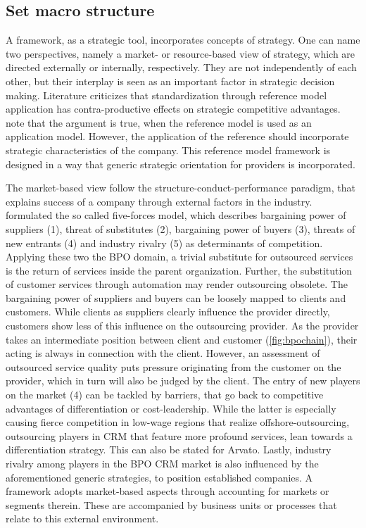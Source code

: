 	
	
	\subsection{Set macro structure}
	
	A framework, as a strategic tool, incorporates concepts of strategy. One can name two perspectives, namely a market- or resource-based view of strategy, which are directed externally or internally, respectively. They are not independently of each other, but their interplay is seen as an important factor in strategic decision making. Literature criticizes that standardization through reference model application has contra-productive effects on strategic competitive advantages. \cite{becker2004handelsinformationssysteme} note that the argument is true, when the reference model is used as an application model. However, the application of the reference should incorporate strategic characteristics of the company. This reference model framework is designed in a way that generic strategic orientation for providers is incorporated. 
	
	The market-based view follow the structure-conduct-performance paradigm, that explains success of a company through external factors in the industry. \cite{porter1980} formulated the so called five-forces model, which describes bargaining power of suppliers (1), threat of substitutes (2), bargaining power of buyers (3), threats of new entrants (4) and industry rivalry (5) as determinants of competition. Applying these two the BPO domain, a trivial substitute for outsourced services is the return of services inside the parent organization. Further, the substitution of customer services through automation may render outsourcing obsolete. The bargaining power of suppliers and buyers can be loosely mapped to clients and customers. While clients as suppliers clearly influence the provider directly, customers show less of this influence on the outsourcing provider. As the provider takes an intermediate position between client and customer (\cf \Fig \ref{fig:bpochain}), their acting is always in connection with the client. However, an assessment of outsourced service quality puts pressure originating from the customer on the provider, which in turn will also be judged by the client. The entry of new players on the market (4) can be tackled by barriers, that go back to competitive advantages of differentiation or cost-leadership. While the latter is especially causing fierce competition in low-wage regions that realize offshore-outsourcing, outsourcing players in CRM that feature more profound services, lean towards a differentiation strategy. This can also be stated for Arvato. Lastly, industry rivalry among players in the BPO CRM market is also influenced by the aforementioned generic strategies, to position established companies. A framework adopts market-based aspects through accounting for markets or segments therein. These are accompanied by business units or processes that relate to this external environment. 
	
